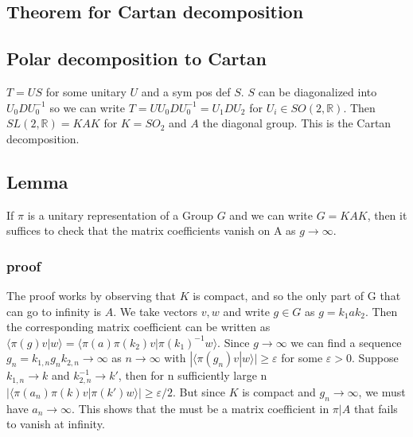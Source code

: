\documentclass[
]{article}
\begin{document}
\hypertarget{theorem-for-cartan-decomposition}{%
\subsection{Theorem for Cartan
decomposition}\label{theorem-for-cartan-decomposition}}

\hypertarget{polar-decomposition-to-cartan}{%
\subsection{Polar decomposition to
Cartan}\label{polar-decomposition-to-cartan}}

\(T = US\) for some unitary \(U\) and a sym pos def \(S\). \(S\) can be
diagonalized into \(U_0 D U_0^{-1}\) so we can write
\(T = U U_0 D U_0^{-1} = U_1 D U_2\) for \(U_i \in SO(2, \mathbb{R})\).
Then \(SL(2, \mathbb{R}) = KAK\) for \(K = SO_2\) and \(A\) the diagonal
group. This is the Cartan decomposition.

\hypertarget{lemma}{%
\subsection{Lemma}\label{lemma}}

If \(\pi\) is a unitary representation of a Group \(G\) and we can write
\(G = KAK\), then it suffices to check that the matrix coefficients
vanish on A as \(g \rightarrow \infty\).

\hypertarget{proof-1}{%
\subsubsection{proof}\label{proof-1}}

The proof works by observing that \(K\) is compact, and so the only part
of G that can go to infinity is \(A\). We take vectors \(v, w\) and
write \(g \in G\) as \(g = k_1 a k_2\). Then the corresponding matrix
coefficient can be written as
\(\langle \pi(g)v|w \rangle = \langle \pi(a) \pi(k_2) v | \pi(k_1)^{-1} w \rangle\).
Since \(g \rightarrow \infty\) we can find a sequence
\(g_n = k_{1,n} g_{n} k_{2,n} \rightarrow \infty\) as
\(n \rightarrow \infty\) with
\(|\langle \pi(g_n) v | w \rangle | \geq \varepsilon\) for some
\(\varepsilon > 0\). Suppose \(k_{1,n} \rightarrow k\) and
\(k_{2,n}^{-1} \rightarrow k'\), then for n sufficiently large n
\(|\langle \pi(a_n)\pi(k)v | \pi(k') w \rangle | \geq \varepsilon/2\).
But since \(K\) is compact and \(g_n \rightarrow \infty\), we must have
\(a_n \rightarrow \infty\). This shows that the must be a matrix
coefficient in \(\pi | A\) that fails to vanish at infinity.
\end{document}
